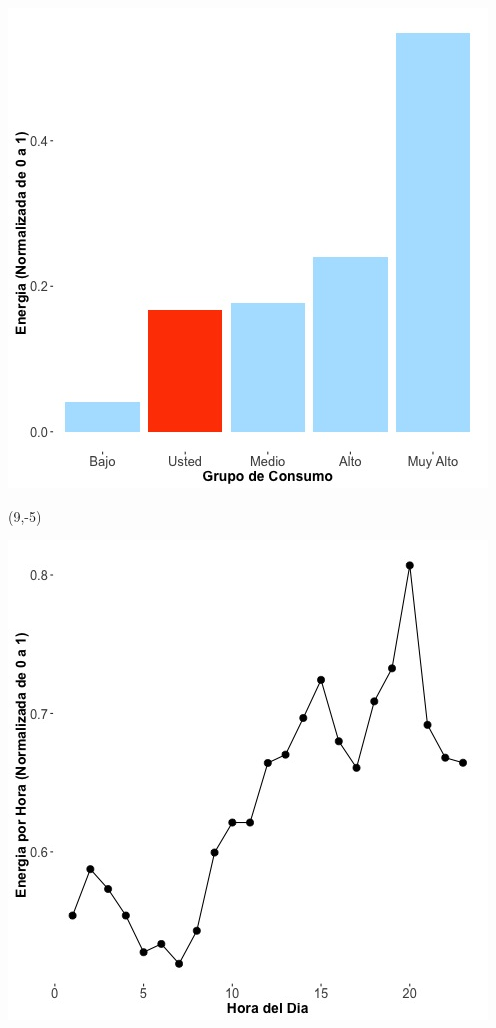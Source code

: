 \documentclass{article}\usepackage[]{graphicx}\usepackage[]{color}
\newenvironment{knitrout}{}{} %
\begin{document}
\begin{knitrout}
\color{fgcolor}
\includegraphics[scale=0.65]{figure/A25_neighbor_plot} 
\end{knitrout}

 \begin{textblock}{1}(9,-5)
\begin{minipage}{20em}
\begingroup

\endgroup
\end{minipage}
\end{textblock}


\begin{knitrout}
\color{fgcolor}
\includegraphics[scale=0.65]{figure/A25_plot_norm_median} 
\end{knitrout}
\end{document}
